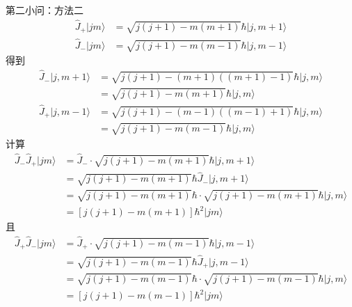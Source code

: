 第二小问：方法二
\begin{equation}
    \begin{aligned}
        \hat{J}_+|jm\rangle &=\sqrt{j\left( j+1 \right) -m\left( m+1 \right)}\hbar |j,m+1\rangle 
\\
\hat{J}_-|jm\rangle &=\sqrt{j\left( j+1 \right) -m\left( m-1 \right)}\hbar |j,m-1\rangle 
    \end{aligned}
\end{equation}
得到
\begin{equation}
    \begin{aligned}
        \hat{J}_-|j,m+1\rangle &=\sqrt{j\left( j+1 \right) -\left( m+1 \right) \left( \left( m+1 \right) -1 \right)}\hbar |j,m\rangle 
\\
&=\sqrt{j\left( j+1 \right) -m\left( m+1 \right)}\hbar |j,m\rangle 
\\
\hat{J}_+|j,m-1\rangle &=\sqrt{j\left( j+1 \right) -\left( m-1 \right) \left( \left( m-1 \right) +1 \right)}\hbar |j,m\rangle 
\\
&=\sqrt{j\left( j+1 \right) -m\left( m-1 \right)}\hbar |j,m\rangle 
    \end{aligned}
\end{equation}
计算
\begin{equation}
    \begin{aligned}
         \hat{J}_-\hat{J}_+|jm\rangle &=\hat{J}_-\cdot \sqrt{j\left( j+1 \right) -m\left( m+1 \right)}\hbar |j,m+1\rangle 
\\
&=\sqrt{j\left( j+1 \right) -m\left( m+1 \right)}\hbar \hat{J}_-|j,m+1\rangle 
\\
&=\sqrt{j\left( j+1 \right) -m\left( m+1 \right)}\hbar \cdot \sqrt{j\left( j+1 \right) -m\left( m+1 \right)}\hbar |j,m\rangle 
\\
&=\left[ j\left( j+1 \right) -m\left( m+1 \right) \right] \hbar ^2|jm\rangle 
    \end{aligned}
\end{equation}
且
\begin{equation}
    \begin{aligned}
         \hat{J}_+\hat{J}_-|jm\rangle &=\hat{J}_+\cdot \sqrt{j\left( j+1 \right) -m\left( m-1 \right)}\hbar |j,m-1\rangle 
\\
&=\sqrt{j\left( j+1 \right) -m\left( m-1 \right)}\hbar \hat{J}_+|j,m-1\rangle 
\\
&=\sqrt{j\left( j+1 \right) -m\left( m-1 \right)}\hbar \cdot \sqrt{j\left( j+1 \right) -m\left( m-1 \right)}\hbar |j,m\rangle 
\\
&=\left[ j\left( j+1 \right) -m\left( m-1 \right) \right] \hbar ^2|jm\rangle 
    \end{aligned}
\end{equation}

